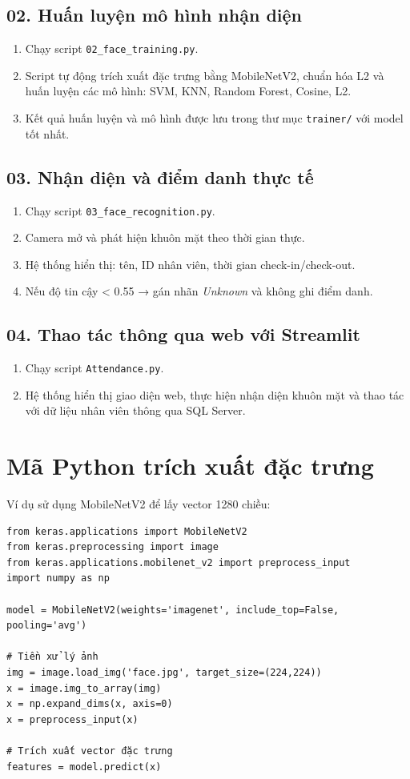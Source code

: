 \documentclass[a4paper]{book}
\begin{document}
\subsection*{02. Huấn luyện mô hình nhận diện}
\begin{enumerate}
    \item Chạy script \texttt{02\_face\_training.py}.
    \item Script tự động trích xuất đặc trưng bằng MobileNetV2, chuẩn hóa L2 và huấn luyện các mô hình: SVM, KNN, Random Forest, Cosine, L2.
    \item Kết quả huấn luyện và mô hình được lưu trong thư mục \texttt{trainer/} với model tốt nhất.
\end{enumerate}

\subsection*{03. Nhận diện và điểm danh thực tế}
\begin{enumerate}
    \item Chạy script \texttt{03\_face\_recognition.py}.
    \item Camera mở và phát hiện khuôn mặt theo thời gian thực.
    \item Hệ thống hiển thị: tên, ID nhân viên, thời gian check-in/check-out.
    \item Nếu độ tin cậy < 0.55 → gán nhãn \textit{Unknown} và không ghi điểm danh.

\end{enumerate}
\subsection*{04. Thao tác thông qua web với Streamlit}
\begin{enumerate}
    \item Chạy script \texttt{Attendance.py}.
    \item Hệ thống hiển thị giao diện web, thực hiện nhận diện khuôn mặt và thao tác với dữ liệu nhân viên thông qua SQL Server.
\end{enumerate}


\section{Mã Python trích xuất đặc trưng}
Ví dụ sử dụng MobileNetV2 để lấy vector 1280 chiều:
\begin{verbatim}
from keras.applications import MobileNetV2
from keras.preprocessing import image
from keras.applications.mobilenet_v2 import preprocess_input
import numpy as np

model = MobileNetV2(weights='imagenet', include_top=False, pooling='avg')

# Tiền xử lý ảnh
img = image.load_img('face.jpg', target_size=(224,224))
x = image.img_to_array(img)
x = np.expand_dims(x, axis=0)
x = preprocess_input(x)

# Trích xuất vector đặc trưng
features = model.predict(x)
\end{verbatim}
\end{document}
